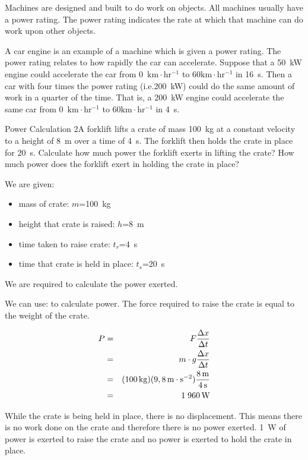 Machines are designed and built to do work on objects. All machines usually have a power rating. The power rating indicates the rate at which that machine can do work upon other objects. 

A car engine is an example of a machine which is given a power rating. The power rating relates to how rapidly the car can accelerate. Suppose that a 50~kW engine could accelerate the car from 0~$\mathrm{km\cdot hr^{-1}}$ to 60$\mathrm{km\cdot hr^{-1}}$ in 16~s. Then a car with four times the power rating (i.e.\@ 200~kW) could do the same amount of work in a quarter of the time. That is, a 200~kW engine could accelerate the same car from 0~$\mathrm{km\cdot hr^{-1}}$ to 60$\mathrm{km\cdot hr^{-1}}$ in 4~s.

\begin{wex}{Power Calculation 2}{A forklift lifts a crate of mass 100~kg at a constant velocity to a height of 8~m over a time of 4~s. The forklift then holds the crate in place for 20~s. Calculate how much power the forklift exerts in lifting the crate? How much power does the forklift exert in holding the crate in place?}
{
We are given:
\begin{itemize}
\item{mass of crate: $m$=100~kg}
\item{height that crate is raised: $h$=8~m}
\item{time taken to raise crate: $t_r$=4~s}
\item{time that crate is held in place: $t_s$=20~s}
\end{itemize}
We are required to calculate the power exerted.

We can use:
to calculate power. The force required to raise the crate is equal to the weight of the crate.

\begin{eqnarray*}
P&=&F\frac{\Delta x}{\Delta t}\\
&=&m\cdot g\frac{\Delta x}{\Delta t}\\
&=&(100\,\mathrm{kg})(9,8\,\mathrm{m \cdot s^{-2}})\frac{8\,\rm{m}}{4\,\mathrm{s}}\\
&=&1\;960\,\mathrm{W}
\end{eqnarray*}

While the crate is being held in place, there is no displacement. This means there is no work done on the crate and therefore there is no power exerted.
1~W of power is exerted to raise the crate and no power is exerted to hold the crate in place.
}
\end{wex}

